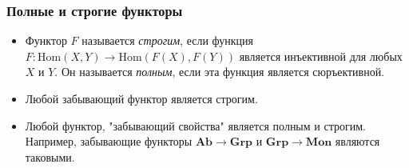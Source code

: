 \documentclass{beamer}
\theoremstyle{definition}
\newcommand{\cat}[1]{\mathbf{#1}}
\newcommand{\Mon}{\cat{Mon}}
\newcommand{\Grp}{\cat{Grp}}
\newcommand{\Ab}{\cat{Ab}}
\newcommand{\fs}[1]{\mathrm{#1}}
\newcommand{\Hom}{\fs{Hom}}
\begin{document}
\begin{frame}
\frametitle{Полные и строгие функторы}
\begin{itemize}
\item Функтор $F$ называется \emph{строгим}, если функция $F : \Hom(X,Y) \to \Hom(F(X),F(Y))$ является инъективной для любых $X$ и $Y$.
Он называется \emph{полным}, если эта функция является сюръективной.
\item Любой забывающий функтор является строгим.
\item Любой функтор, "забывающий свойства" является полным и строгим.
Например, забывающие функторы $\Ab \to \Grp$ и $\Grp \to \Mon$ являются таковыми.
\end{itemize}
\end{frame}
\end{document}
